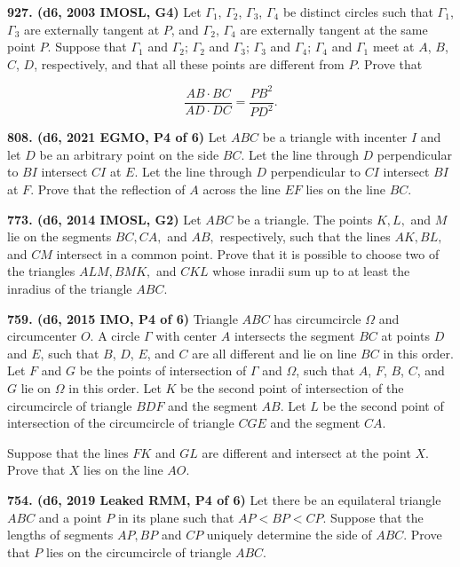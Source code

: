\documentclass{article}
\begin{document}
\textbf{927. (\color{red}d6\color{black}, 2003 IMOSL, G4)} Let $\Gamma_1$, $\Gamma_2$, $\Gamma_3$, $\Gamma_4$ be distinct circles such that $\Gamma_1$, $\Gamma_3$ are externally tangent at $P$, and $\Gamma_2$, $\Gamma_4$ are externally tangent at the same point $P$. Suppose that $\Gamma_1$ and $\Gamma_2$; $\Gamma_2$ and $\Gamma_3$; $\Gamma_3$ and $\Gamma_4$; $\Gamma_4$ and $\Gamma_1$ meet at $A$, $B$, $C$, $D$, respectively, and that all these points are different from $P$. Prove that

\[ \frac{AB\cdot BC}{AD\cdot DC}=\frac{PB^2}{PD^2}. \]

\textbf{808. (\color{red}d6\color{black}, 2021 EGMO, P4 of 6)} Let $ABC$ be a triangle with incenter $I$ and let $D$ be an arbitrary point on the side $BC$. Let the line through $D$ perpendicular to $BI$ intersect $CI$ at $E$. Let the line through $D$ perpendicular to $CI$ intersect $BI$ at $F$. Prove that the reflection of $A$ across the line $EF$ lies on the line $BC$.

\textbf{773. (\color{red}d6\color{black}, 2014 IMOSL, G2)} Let $ABC$ be a triangle. The points $K, L,$ and $M$ lie on the segments $BC, CA,$ and $AB,$ respectively, such that the lines $AK, BL,$ and $CM$ intersect in a common point. Prove that it is possible to choose two of the triangles $ALM, BMK,$ and $CKL$ whose inradii sum up to at least the inradius of the triangle $ABC$.

\textbf{759. (\color{red}d6\color{black}, 2015 IMO, P4 of 6)} Triangle $ABC$ has circumcircle $\Omega$ and circumcenter $O$. A circle $\Gamma$ with center $A$ intersects the segment $BC$ at points $D$ and $E$, such that $B$, $D$, $E$, and $C$ are all different and lie on line $BC$ in this order. Let $F$ and $G$ be the points of intersection of $\Gamma$ and $\Omega$, such that $A$, $F$, $B$, $C$, and $G$ lie on $\Omega$ in this order. Let $K$ be the second point of intersection of the circumcircle of triangle $BDF$ and the segment $AB$. Let $L$ be the second point of intersection of the circumcircle of triangle $CGE$ and the segment $CA$.

Suppose that the lines $FK$ and $GL$ are different and intersect at the point $X$. Prove that $X$ lies on the line $AO$.

\textbf{754. (\color{red}d6\color{black}, 2019 Leaked RMM, P4 of 6)} Let there be an equilateral triangle $ABC$ and a point $P$ in its plane such that $AP<BP<CP.$ Suppose that the lengths of segments $AP,BP$ and $CP$ uniquely determine the side of $ABC$. Prove that $P$ lies on the circumcircle of triangle $ABC.$
\end{document}
